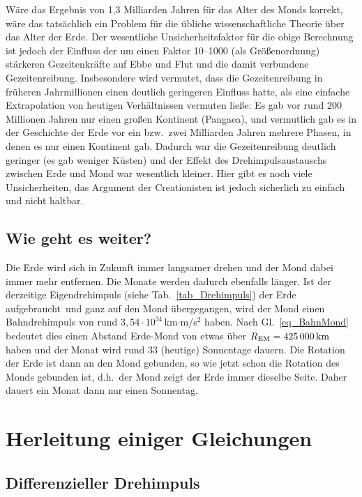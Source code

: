 W\"are das Ergebnis von 1,3 Milliarden Jahren f\"ur das Alter des Monds korrekt, w\"are das
tats\"achlich ein Problem f\"ur die \"ubliche wissenschaftliche Theorie \"uber das Alter der Erde.
Der wesentliche Unsicherheitsfaktor f\"ur die obige Berechnung ist jedoch der Einfluss der um einen
Faktor 10--1000 (als Gr\"o\ss enordnung) st\"arkeren Gezeitenkr\"afte auf Ebbe und Flut und die 
damit verbundene Gezeitenreibung. Insbesondere wird vermutet, dass die Gezeitenreibung in
fr\"uheren Jahrmillionen einen deutlich geringeren Einfluss hatte, als eine einfache Extrapolation
von heutigen Verh\"altnissen vermuten lie\ss e: Es gab vor rund 200 Millionen Jahren nur einen gro\ss en
Kontinent (Pangaea), und vermutlich gab es in der Geschichte der Erde vor ein bzw.\ zwei Milliarden
Jahren mehrere Phasen, in denen es nur einen Kontinent gab. Dadurch war die Gezeitenreibung
deutlich geringer (es gab weniger K\"usten) und der Effekt des Dreh\-impulsaustauschs zwischen Erde
und Mond war wesentlich kleiner. Hier gibt es noch viele Unsicherheiten, das Argument der
Creationisten ist jedoch sicherlich zu einfach und nicht haltbar.

\subsection{Wie geht es weiter?}

Die Erde wird sich in Zukunft immer langsamer drehen und der Mond dabei immer mehr
entfernen. Die Monate werden dadurch ebenfalls l\"anger. Ist der derzeitige Eigendrehimpuls
(siehe Tab.\ \ref{tab_Drehimpuls}) der Erde \glqq aufgebraucht\grqq\ und ganz auf den Mond \"ubergegangen,
wird der Mond einen Bahndrehimpuls von rund $3,54\cdot 10^{34}$\,km$\cdot$m/s${}^2$ haben.
Nach Gl.\ \ref{eq_BahnMond} bedeutet dies einen Abstand Erde-Mond von etwas \"uber 
$R_{\rm EM}=425\,000\,{\rm km}$ haben und der Monat wird rund 33 (heutige) Sonnentage dauern.   
Die Rotation der Erde ist dann an den Mond gebunden, so wie jetzt schon die Rotation des
Monds gebunden ist, d.h.\ der Mond zeigt der Erde immer dieselbe Seite. Daher dauert ein Monat
dann nur einen Sonnentag. 

\newpage

\section{Herleitung einiger Gleichungen}

\subsection{Differenzieller Drehimpuls}
\label{secB}

